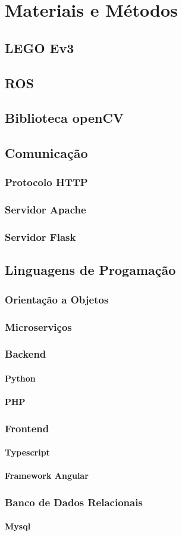 \chapter{Materiais e Métodos}



\section{LEGO Ev3}
\section{ROS}
\section{Biblioteca openCV}
\section{Comunicação}
\subsection{Protocolo HTTP}
\subsection{Servidor Apache}
\subsection{Servidor Flask}
\section{Linguagens de Progamação}
\subsection{Orientação a Objetos}
\subsection{Microserviços}
\subsection{Backend}
\subsubsection{Python}
\subsubsection{PHP}
\subsection{Frontend}
\subsubsection{Typescript}
\subsubsection{Framework Angular}
\subsection{Banco de Dados Relacionais}
\subsubsection{Mysql}